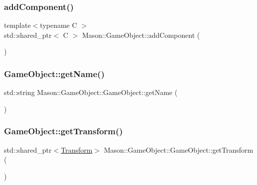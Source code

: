 \subsubsection{\texorpdfstring{add\+Component()}{addComponent()}}
{\footnotesize\ttfamily template$<$typename C $>$ \\
std\+::shared\+\_\+ptr$<$ C $>$ Mason\+::\+Game\+Object\+::add\+Component (\begin{DoxyParamCaption}{ }\end{DoxyParamCaption})}

\hypertarget{class_mason_1_1_game_object_a4b858c3219a8f08b823a4266945fd724}{}\label{class_mason_1_1_game_object_a4b858c3219a8f08b823a4266945fd724} 
\subsubsection{\texorpdfstring{Game\+Object\+::get\+Name()}{GameObject::getName()}}
{\footnotesize\ttfamily std\+::string Mason\+::\+Game\+Object\+::\+Game\+Object\+::get\+Name (\begin{DoxyParamCaption}{ }\end{DoxyParamCaption})}

\hypertarget{class_mason_1_1_game_object_a0c6b2e4785181f1ab8684fc4af3f170d}{}\label{class_mason_1_1_game_object_a0c6b2e4785181f1ab8684fc4af3f170d} 
\subsubsection{\texorpdfstring{Game\+Object\+::get\+Transform()}{GameObject::getTransform()}}
{\footnotesize\ttfamily std\+::shared\+\_\+ptr$<$\hyperlink{class_mason_1_1_transform}{Transform}$>$ Mason\+::\+Game\+Object\+::\+Game\+Object\+::get\+Transform (\begin{DoxyParamCaption}{ }\end{DoxyParamCaption})}

\hypertarget{class_mason_1_1_game_object_ad4e182d7070d243ccbe239459460c36e}{}\label{class_mason_1_1_game_object_ad4e182d7070d243ccbe239459460c36e} 
